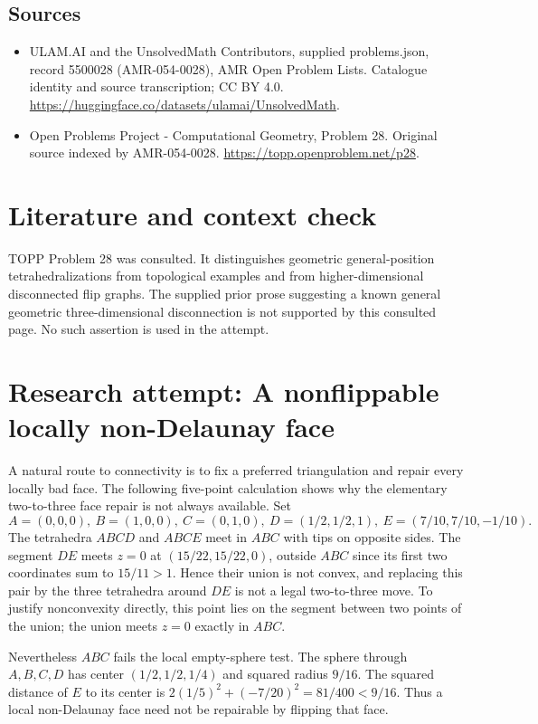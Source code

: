\documentclass[11pt,a4paper]{article}
\begin{document}
\subsection{Sources}
\begin{itemize}
\item[S1] ULAM.AI and the UnsolvedMath Contributors, supplied problems.json, record 5500028 (AMR-054-0028), AMR Open Problem Lists. Catalogue identity and source transcription; CC BY 4.0.
\url{https://huggingface.co/datasets/ulamai/UnsolvedMath}.
\item[S2] Open Problems Project - Computational Geometry, Problem 28. Original source indexed by AMR-054-0028.
\url{https://topp.openproblem.net/p28}.
\end{itemize}

\section{Literature and context check}
TOPP Problem 28 was consulted. It distinguishes geometric general-position
tetrahedralizations from topological examples and from higher-dimensional
disconnected flip graphs. The supplied prior prose suggesting a known general
geometric three-dimensional disconnection is not supported by this consulted page.
No such assertion is used in the attempt.
\section{Research attempt: A nonflippable locally non-Delaunay face}
A natural route to connectivity is to fix a preferred triangulation and repair
every locally bad face. The following five-point calculation shows why the
elementary two-to-three face repair is not always available. Set
\[
 A=(0,0,0),\ B=(1,0,0),\ C=(0,1,0),\
 D=(1/2,1/2,1),\ E=(7/10,7/10,-1/10).
\]
The tetrahedra $ABCD$ and $ABCE$ meet in $ABC$ with tips on opposite sides.
The segment $DE$ meets $z=0$ at $(15/22,15/22,0)$, outside $ABC$ since
its first two coordinates sum to $15/11>1$. Hence their union is not convex,
and replacing this pair by the three tetrahedra around $DE$ is not a legal
two-to-three move. To justify nonconvexity directly, this point lies on the
segment between two points of the union; the union meets $z=0$ exactly in $ABC$.

Nevertheless $ABC$ fails the local empty-sphere test. The sphere through
$A,B,C,D$ has center $(1/2,1/2,1/4)$ and squared radius $9/16$.
The squared distance of $E$ to its center is
$2(1/5)^2+(-7/20)^2=81/400<9/16$. Thus a local non-Delaunay face need not
be repairable by flipping that face.
\end{document}
